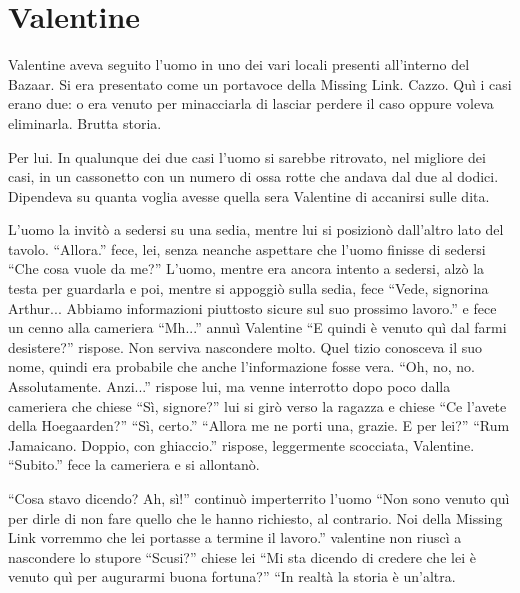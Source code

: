   \section*{Valentine}

    Valentine aveva seguito l'uomo in uno dei vari locali presenti all'interno del Bazaar. Si era presentato come un
    portavoce della Missing Link. Cazzo. Quì i casi erano due: o era venuto per minacciarla di lasciar perdere il caso
    oppure voleva eliminarla. Brutta storia.

    Per lui. In qualunque dei due casi l'uomo si sarebbe ritrovato, nel migliore dei casi, in un cassonetto con un
    numero di ossa rotte che andava dal due al dodici. Dipendeva su quanta voglia avesse quella sera Valentine di
    accanirsi sulle dita.

    L'uomo la invitò a sedersi su una sedia, mentre lui si posizionò dall'altro lato del tavolo. ``Allora.'' fece, lei,
    senza neanche aspettare che l'uomo finisse di sedersi ``Che cosa vuole da me?'' L'uomo, mentre era ancora intento a
    sedersi, alzò la testa per guardarla e poi, mentre si appoggiò sulla sedia, fece ``Vede, signorina Arthur... Abbiamo
    informazioni piuttosto sicure sul suo prossimo lavoro.'' e fece un cenno alla cameriera ``Mh...'' annuì Valentine
    ``E quindi è venuto quì dal farmi desistere?'' rispose. Non serviva nascondere molto. Quel tizio conosceva il suo
    nome, quindi era probabile che anche l'informazione fosse vera. ``Oh, no, no. Assolutamente. Anzi...'' rispose lui,
    ma venne interrotto dopo poco dalla cameriera che chiese ``Sì, signore?'' lui si girò verso la ragazza e chiese ``Ce
    l'avete della Hoegaarden?'' ``Sì, certo.'' ``Allora me ne porti una, grazie. E per lei?'' ``Rum Jamaicano. Doppio,
    con ghiaccio.'' rispose, leggermente scocciata, Valentine. ``Subito.'' fece la cameriera e si allontanò.

    ``Cosa stavo dicendo? Ah, sì!'' continuò imperterrito l'uomo ``Non sono venuto quì per dirle di non fare quello che
    le hanno richiesto, al contrario. Noi della Missing Link vorremmo che lei portasse a termine il lavoro.'' valentine
    non riuscì a nascondere lo stupore ``Scusi?'' chiese lei ``Mi sta dicendo di credere che lei è venuto quì per augurarmi buona
    fortuna?'' ``In realtà la storia è un'altra.
